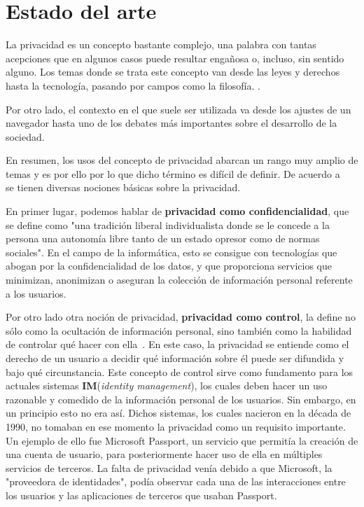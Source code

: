 \chapter{Estado del arte}
\label{chap:estadodelarte}

\label{sec:conceptos}
La privacidad es un concepto bastante complejo, una palabra con tantas
acepciones que en algunos casos puede resultar engañosa o, incluso,
sin sentido alguno. Los temas donde se trata este
 concepto van desde las leyes y derechos hasta la
tecnología, pasando por campos como la
  filosofía. .

Por otro lado, el contexto en el que suele ser utilizada va desde los
ajustes de un navegador hasta uno de los debates más importantes sobre
el desarrollo de la sociedad.

En resumen, los usos del concepto de privacidad abarcan un rango
muy amplio  de
temas y es por ello por lo que dicho término es difícil de definir. De
acuerdo a ~\cite{article:danezis2010} se tienen diversas nociones
básicas sobre la privacidad.

En primer lugar, podemos hablar de \textbf{privacidad como
  confidencialidad}, que se define como "una tradición liberal
individualista donde se le concede a la persona una autonomía libre
tanto de un estado opresor como de normas sociales". En el campo de la
informática, esto se consigue con tecnologías que abogan por la
confidencialidad de los datos, y que proporciona servicios que
minimizan, anonimizan o aseguran la colección de información personal
referente a los usuarios.

Por otro lado otra noción de privacidad, \textbf{privacidad como
  control}, la define no sólo como la ocultación de información
personal, sino también como la habilidad de controlar qué hacer con
ella~\cite{lane2014privacy}.  En este caso, la privacidad se entiende
como el derecho de un usuario a decidir qué información sobre él puede
ser difundida y bajo qué circunstancia. Este concepto de control sirve
como fundamento para los actuales sistemas
\textbf{IM}(\textit{identity management}), los cuales deben hacer un
uso razonable y comedido de la información personal de los
usuarios. Sin embargo, en un principio esto no era así.  Dichos
sistemas, los cuales nacieron en la década de 1990, no tomaban en ese
momento la privacidad como un requisito importante. Un ejemplo de ello
fue Microsoft Passport, un servicio que permitía la creación de una
cuenta de usuario, para posteriormente hacer uso de ella en múltiples
servicios de terceros. La falta de privacidad venía debido a que
Microsoft, la "proveedora de identidades", podía observar cada una de
las interacciones entre los usuarios y las aplicaciones de terceros
que usaban Passport.

